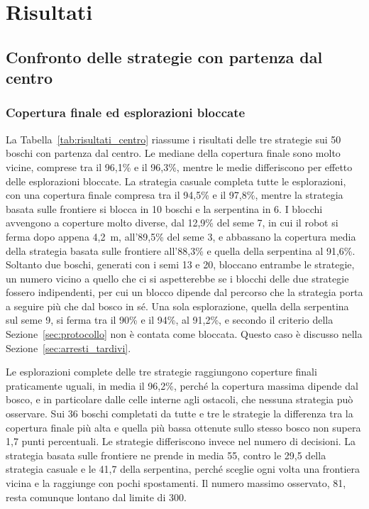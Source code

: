\chapter{Risultati}
\label{cap:risultati}

\section{Confronto delle strategie con partenza dal centro}
\label{sec:risultati_centro}

\subsection{Copertura finale ed esplorazioni bloccate}
\label{sec:copertura_finale}

La Tabella~\ref{tab:risultati_centro} riassume i risultati delle tre strategie sui 50 boschi con partenza dal centro. Le mediane della copertura finale sono molto vicine, comprese tra il 96,1\% e il 96,3\%, mentre le medie differiscono per effetto delle esplorazioni bloccate. La strategia casuale completa tutte le esplorazioni, con una copertura finale compresa tra il 94,5\% e il 97,8\%, mentre la strategia basata sulle frontiere si blocca in 10 boschi e la serpentina in 6. I blocchi avvengono a coperture molto diverse, dal 12,9\% del seme 7, in cui il robot si ferma dopo appena 4,2~m, all'89,5\% del seme 3, e abbassano la copertura media della strategia basata sulle frontiere all'88,3\% e quella della serpentina al 91,6\%. Soltanto due boschi, generati con i semi 13 e 20, bloccano entrambe le strategie, un numero vicino a quello che ci si aspetterebbe se i blocchi delle due strategie fossero indipendenti, per cui un blocco dipende dal percorso che la strategia porta a seguire più che dal bosco in sé. Una sola esplorazione, quella della serpentina sul seme 9, si ferma tra il 90\% e il 94\%, al 91,2\%, e secondo il criterio della Sezione~\ref{sec:protocollo} non è contata come bloccata. Questo caso è discusso nella Sezione~\ref{sec:arresti_tardivi}.

Le esplorazioni complete delle tre strategie raggiungono coperture finali praticamente uguali, in media il 96,2\%, perché la copertura massima dipende dal bosco, e in particolare dalle celle interne agli ostacoli, che nessuna strategia può osservare. Sui 36 boschi completati da tutte e tre le strategie la differenza tra la copertura finale più alta e quella più bassa ottenute sullo stesso bosco non supera 1,7 punti percentuali. Le strategie differiscono invece nel numero di decisioni. La strategia basata sulle frontiere ne prende in media 55, contro le 29,5 della strategia casuale e le 41,7 della serpentina, perché sceglie ogni volta una frontiera vicina e la raggiunge con pochi spostamenti. Il numero massimo osservato, 81, resta comunque lontano dal limite di 300.

